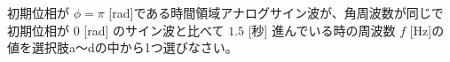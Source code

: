 初期位相が $\phi=\pi$ [rad]である時間領域アナログサイン波が、角周波数が同じで初期位相が $0$ [rad] のサイン波と比べて $1.5$ [秒] 進んでいる時の周波数 $f$ [Hz]の値を選択肢a〜dの中から1つ選びなさい。
